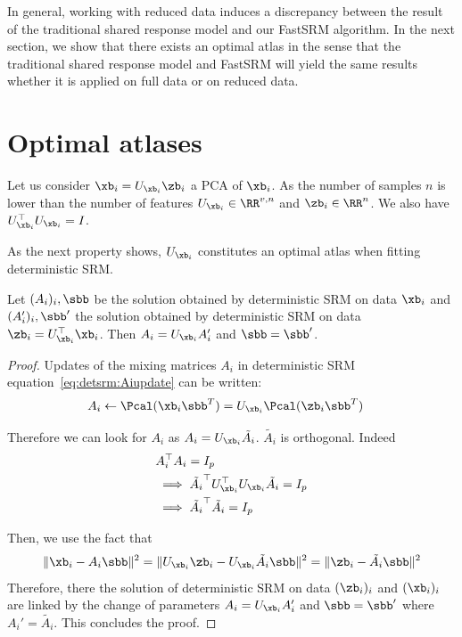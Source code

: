 In general, working with reduced data induces a discrepancy between the result
of the traditional shared response model  and our FastSRM algorithm.
In the next section, we show that there exists an optimal atlas in the sense
that the traditional shared response model and FastSRM will yield the same
results whether it is applied on full data or on reduced data.

\section{Optimal atlases}
Let us consider $\xb_i = U_{\xb_i} \zb_i$ a PCA of $\xb_i$. As the number of
samples $n$ is lower than the number of features $U_{\xb_i} \in \RR^{v, n}$ and
$\zb_i \in \RR^{n}$.  We also have $U_{\xb_i}^{\top}U_{\xb_i} = I$.

As the next property shows, $U_{\xb_i}$ constitutes an optimal atlas when
fitting deterministic SRM.
\begin{prop}
  Let $(A_i)_i, \sbb$ be the solution obtained by deterministic SRM on data
  $\xb_i$ and $(A_i')_i, \sbb'$ the solution obtained by deterministic SRM on
  data $\zb_i = U_{\xb_i}^{\top} \xb_i$. Then $A_i = U_{\xb_i}A_i'$ and $\sbb = \sbb'$. 
\label{prop:optimaldetsrm}
\end{prop}
\begin{proof}
Updates of the mixing matrices $A_i$ in deterministic SRM
equation~\eqref{eq:detsrm:Aiupdate} can be written:
\begin{align}
  A_i &\leftarrow \Pcal(\xb_i \sbb^T)= U_{\xb_i}\Pcal(\zb_i \sbb^T)
\end{align}

Therefore we can look for $A_i$ as $A_i = U_{\xb_i} \tilde{A_i}$. $\tilde{A_i}$ is
orthogonal. Indeed
\begin{align}
  &A_i^{\top} A_i = I_p \\
  & \implies \tilde{A_i}^{\top}U_{\xb_i}^{\top} U_{\xb_i} \tilde{A_i} = I_p \\
  & \implies \tilde{A_i}^{\top} \tilde{A_i} = I_p
\end{align}

Then, we use the fact that
\begin{align}
  \|\xb_i - A_i \sbb \|^2 = \| U_{\xb_i}\zb_i - U_{\xb_i}\tilde{A_i} \sbb\|^2 = \| \zb_i - \tilde{A_i} \sbb \|^2
  \label{eq:equality:xy}
\end{align}
Therefore, there the solution of deterministic SRM on data $(\zb_i)_i$ and
$(\xb_i)_i$ are linked by the change of parameters $A_i = U_{\xb_i}A_i'$ and
$\sbb = \sbb'$ where $A_i' = \tilde{A_i}$. This concludes the proof.
\end{proof}
